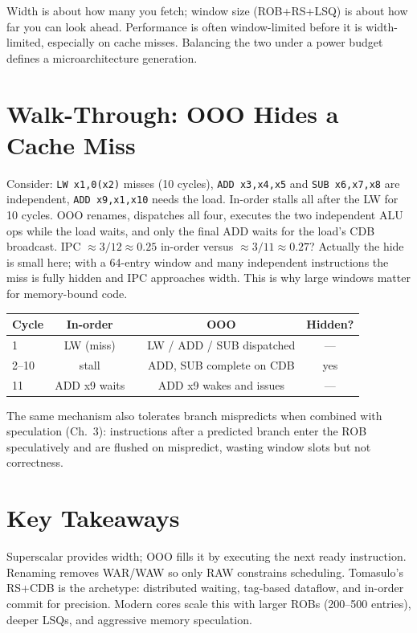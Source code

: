 \begin{remark}
Width is about how many you fetch; window size (ROB+RS+LSQ) is about how far you can look ahead. Performance is often window-limited before it is width-limited, especially on cache misses. Balancing the two under a power budget defines a microarchitecture generation.
\end{remark}

\section{Walk-Through: OOO Hides a Cache Miss}
Consider: \texttt{LW x1,0(x2)} misses (10 cycles), \texttt{ADD x3,x4,x5} and \texttt{SUB x6,x7,x8} are independent, \texttt{ADD x9,x1,x10} needs the load. In-order stalls all after the LW for 10 cycles. OOO renames, dispatches all four, executes the two independent ALU ops while the load waits, and only the final ADD waits for the load's CDB broadcast. IPC $\approx 3/12\approx0.25$ in-order versus $\approx 3/11\approx0.27$? Actually the hide is small here; with a 64-entry window and many independent instructions the miss is fully hidden and IPC approaches width. This is why large windows matter for memory-bound code.

\begin{center}
\begin{tabular}{lcccc}
\toprule Cycle & In-order & & OOO & Hidden? \\ \midrule
1 & LW (miss) & & LW / ADD / SUB dispatched & --- \\
2--10 & stall & & ADD, SUB complete on CDB & yes \\
11 & ADD x9 waits & & ADD x9 wakes and issues & --- \\ \bottomrule
\end{tabular}
\end{center}

The same mechanism also tolerates branch mispredicts when combined with speculation (Ch.~3): instructions after a predicted branch enter the ROB speculatively and are flushed on mispredict, wasting window slots but not correctness.

\section{Key Takeaways}
Superscalar provides width; OOO fills it by executing the next ready instruction. Renaming removes WAR/WAW so only RAW constrains scheduling. Tomasulo's RS+CDB is the archetype: distributed waiting, tag-based dataflow, and in-order commit for precision. Modern cores scale this with larger ROBs (200--500 entries), deeper LSQs, and aggressive memory speculation.

